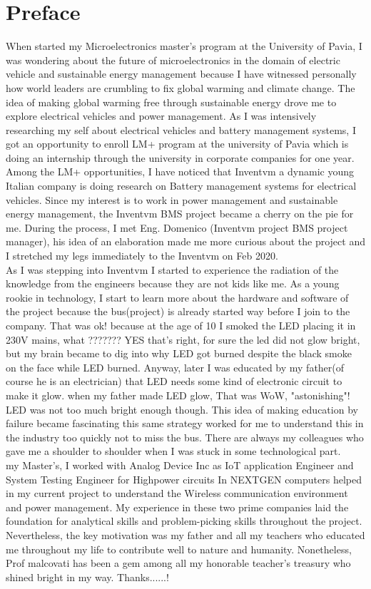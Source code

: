 \chapter{Preface}
When started my Microelectronics master's program at the University of Pavia, I was wondering about the future of microelectronics in the domain of electric vehicle and sustainable energy management because I have witnessed personally how world leaders are crumbling to fix global warming and climate change. The idea of making global warming free through sustainable energy drove me to explore electrical vehicles and power management. As I was intensively researching my self about electrical vehicles and battery management systems, I got an opportunity to enroll LM+ program at the university of Pavia which is doing an internship through the university in corporate companies for one year.\\
\indent Among the LM+ opportunities, I have noticed that Inventvm a dynamic young Italian company is doing research on Battery management systems for electrical vehicles. Since my interest is to work in power management and sustainable energy management, the Inventvm BMS project became a cherry on the pie for me. During the process, I met Eng. Domenico (Inventvm project BMS project manager), his idea of an elaboration made me more curious about the project and I stretched my legs immediately to the Inventvm on Feb 2020.\\
\indent As I was stepping into Inventvm I started to experience the radiation of the knowledge from the engineers because they are not kids like me. As a young rookie in technology, I start to learn more about the hardware and software of the project because the bus(project) is already started way before I join to the company. That was ok! because at the age of 10 I smoked the LED placing it in 230V mains, what ??????? YES that's right, for sure the led did not glow bright, but my brain became to dig into why LED got burned despite the black smoke on the face while LED burned. Anyway, later I was educated by my father(of course he is an electrician) that LED needs some kind of electronic circuit to make it glow. when my father made LED glow, That was WoW, "astonishing"! LED was not too much bright enough though. This idea of making education by failure became fascinating this same strategy worked for me to understand this in the industry too quickly not to miss the bus. There are always my colleagues who gave me a shoulder to shoulder when I was stuck in some technological part.\\
\indentBefore my Master's, I worked with Analog Device Inc as IoT application Engineer and System Testing Engineer for Highpower circuits In NEXTGEN computers helped in my current project to understand the Wireless communication environment and power management. My experience in these two prime companies laid the foundation for analytical skills and problem-picking skills throughout the project. Nevertheless, the key motivation was my father and all my teachers who educated me throughout my life to contribute well to nature and humanity. Nonetheless, Prof malcovati has been a gem among all my honorable teacher's treasury who shined bright in my way. Thanks......!